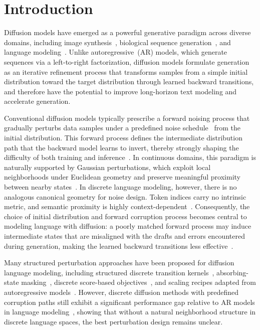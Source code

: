 \section{Introduction}
\vspace{-3pt}

\label{sec:intro}
Diffusion models have emerged as a powerful generative paradigm across diverse domains, including image synthesis~\citep{ddpm, LDM}, biological sequence generation~\citep{diff-bio, diff-protein}, and language modeling~\citep{SEDD, D3PM, MDLM}.
Unlike autoregressive~(AR) models, which generate sequences via a left-to-right factorization, diffusion models formulate generation as an iterative refinement process that transforms samples from a simple initial distribution toward the target distribution through learned backward transitions, and therefore have the potential to improve long-horizon text modeling and accelerate generation.

Conventional diffusion models typically prescribe a forward noising process that gradually perturbs data samples under a predefined noise schedule~\cite{ddpm, MD4} from the initial distribution.
This forward process defines the intermediate distribution path that the backward model learns to invert, thereby strongly shaping the difficulty of both training and inference~\citep{D3PM,iDDPM,design-path}.
In continuous domains, this paradigm is naturally supported by Gaussian perturbations, which exploit local neighborhoods under Euclidean geometry and preserve meaningful proximity between nearby states~\citep{ddpm, score-based}.
In discrete language modeling, however, there is no analogous canonical geometry for noise design.
Token indices carry no intrinsic metric, and semantic proximity is highly context-dependent~\citep{D3PM, ctx_dep}.
Consequently, the choice of initial distribution and forward corruption process becomes central to modeling language with diffusion: a poorly matched forward process may induce intermediate states that are misaligned with the drafts and errors encountered during generation, making the learned backward transitions less effective~\citep{SCUD, mdpo}.

Many structured perturbation approaches have been proposed for diffusion language modeling, including structured discrete transition kernels~\citep{multinomial_diffusion, ctdd, D3PM}, absorbing-state masking~\citep{MDLM,MD4}, discrete score-based objectives~\citep{SEDD, MDM_secret}, and scaling recipes adapted from autoregressive models~\citep{DiffuLLaMA,LLaDA, sdar, dream7b}.
However, discrete diffusion methods with predefined corruption paths still exhibit a significant performance gap relative to AR models in language modeling~\citep{D3PM,gulrajani2023likelihood,he2023diffusionbert,SEDD}, showing that without a natural neighborhood structure in discrete language spaces, the best perturbation design remains unclear.

